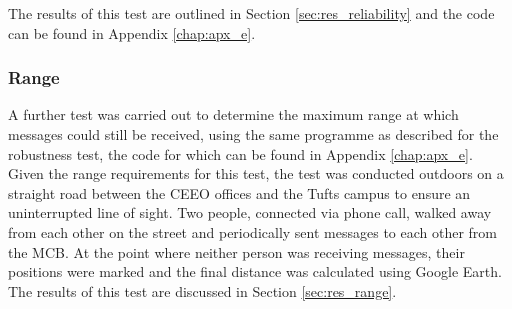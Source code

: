 
The results of this test are outlined in Section \ref{sec:res_reliability} and the code can be found in Appendix \ref{chap:apx_e}.

\subsubsection{\label{sec:methods_test_range}Range}
A further test was carried out to determine the maximum range at which messages could still be received, using the same programme as described for the robustness test, the code for which can be found in Appendix \ref{chap:apx_e}. Given the range requirements for this test, the test was conducted outdoors on a straight road between the CEEO offices and the Tufts campus to ensure an uninterrupted line of sight. 
Two people, connected via phone call, walked away from each other on the street and periodically sent messages to each other from the MCB. At the point where neither person was receiving messages, their positions were marked and the final distance was calculated using Google Earth. The results of this test are discussed in Section \ref{sec:res_range}.

